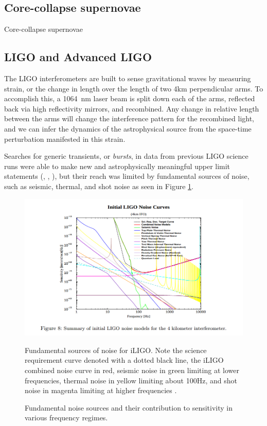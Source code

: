  
\subsection{Core-collapse supernovae} 
Core-collapse supernovae 

%
\subsection{LIGO and Advanced LIGO} 
The LIGO interferometers are built to sense gravitational waves by measuring strain, or the change in length over the length of two 4km perpendicular arms. To accomplish this, a 1064~nm laser beam is split down each of the arms, reflected back via high reflectivity mirrors, and recombined. Any change in relative length between the arms will change the interference pattern for the recombined light, and we can infer the dynamics of the astrophysical source from the space-time perturbation manifested in this strain.

Searches for generic \gw{} transients, or \textit{bursts}, in data from previous LIGO science runs were able to make new and astrophysically meaningful upper limit statements (\cite{Vela}, \cite{BurstAllSky}, \cite{GRBs}), but their reach was limited by fundamental sources of noise, such as seismic, thermal, and shot noise as seen in Figure \ref{fig:iLIGO}.

\begin{figure} 
\centering
\includegraphics[width=\linewidth]{figures/iLIGO_noise_curve.png}
\caption{Fundamental sources of noise for iLIGO. Note the science requirement curve denoted with a dotted black line, the iLIGO combined noise curve in red, seismic noise in green limiting at lower frequencies, thermal noise in yellow limiting about 100Hz, and shot noise in magenta limiting at higher frequencies \cite{iLIGO_poster}.} 
\label{fig:iLIGO_noise}
\caption{Fundamental noise sources and their contribution to sensitivity in various frequency regimes.}
\label{fig:iLIGO} 
\end{figure}

